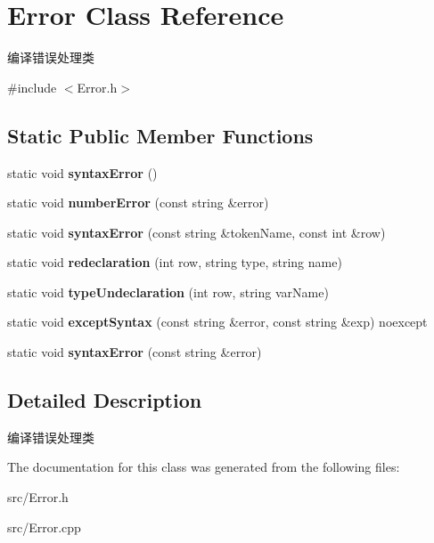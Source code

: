 \hypertarget{class_error}{}\section{Error Class Reference}
\label{class_error}


编译错误处理类  




{\ttfamily \#include $<$Error.\+h$>$}

\subsection*{Static Public Member Functions}
\begin{DoxyCompactItemize}
\item 
\hypertarget{class_error_ab109fea282348f1d8a053f6f27cb3da3}{}\label{class_error_ab109fea282348f1d8a053f6f27cb3da3} 
static void {\bfseries syntax\+Error} ()
\item 
\hypertarget{class_error_a20b415197795d362b17931d3eef70535}{}\label{class_error_a20b415197795d362b17931d3eef70535} 
static void {\bfseries number\+Error} (const string \&error)
\item 
\hypertarget{class_error_a6c43c4d14efc90e466d1bd9093f48239}{}\label{class_error_a6c43c4d14efc90e466d1bd9093f48239} 
static void {\bfseries syntax\+Error} (const string \&token\+Name, const int \&row)
\item 
\hypertarget{class_error_aced969625233c4e4db383f64c3941638}{}\label{class_error_aced969625233c4e4db383f64c3941638} 
static void {\bfseries redeclaration} (int row, string type, string name)
\item 
\hypertarget{class_error_a64d65a105dcdd097818b1d8e9240f25f}{}\label{class_error_a64d65a105dcdd097818b1d8e9240f25f} 
static void {\bfseries type\+Undeclaration} (int row, string var\+Name)
\item 
\hypertarget{class_error_a69513cd6498f5351fff9347375819175}{}\label{class_error_a69513cd6498f5351fff9347375819175} 
static void {\bfseries except\+Syntax} (const string \&error, const string \&exp) noexcept
\item 
\hypertarget{class_error_ad367940974d8904dd9ff0c1d00c7c62c}{}\label{class_error_ad367940974d8904dd9ff0c1d00c7c62c} 
static void {\bfseries syntax\+Error} (const string \&error)
\end{DoxyCompactItemize}


\subsection{Detailed Description}
编译错误处理类 

The documentation for this class was generated from the following files\+:\begin{DoxyCompactItemize}
\item 
src/Error.\+h\item 
src/Error.\+cpp\end{DoxyCompactItemize}
